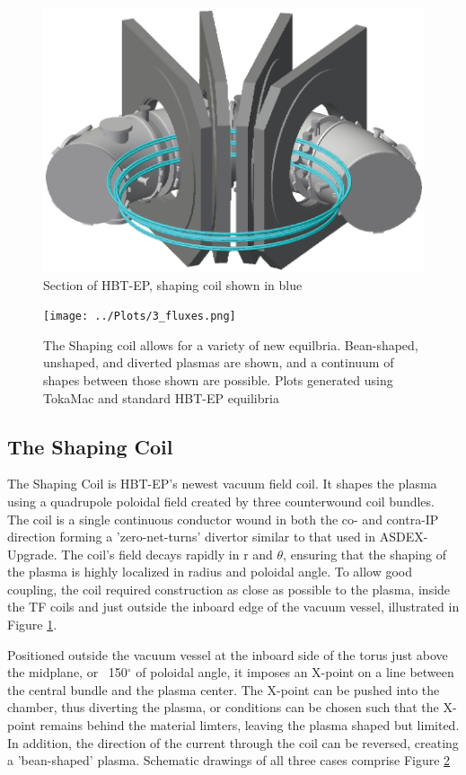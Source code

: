 \documentclass[aps,preprint,showpacs,superscriptaddress,groupedaddress]{revtex4}  %
\begin{document}
\begin{figure}[htb]
	\centering
\includegraphics[scale=.35]{../Plots/HBT_section_cropped.png}\caption{Section of HBT-EP, shaping coil shown in blue}
	\label{Coil_HBT_Section}
	\end{figure}
	
\begin{figure}[htb]
	\centering
\texttt{[image: ../Plots/3\_fluxes.png]}
	\caption{The Shaping coil allows for a variety of new equilbria.  Bean-shaped, unshaped, and diverted plasmas are shown, and a continuum of shapes between those shown are possible.  Plots generated using TokaMac and standard HBT-EP equilibria}
	\label{3_shapes}
	\end{figure}	

\subsection{The Shaping Coil}
    The Shaping Coil is HBT-EP's newest vacuum field coil.  It shapes the plasma using a quadrupole poloidal field created by three counterwound coil bundles.  The coil is a single continuous conductor wound in both the co- and contra-IP direction forming a 'zero-net-turns' divertor similar to that used in ASDEX-Upgrade\cite{Keilhacker}.  The coil's field decays rapidly in r and $\theta$, ensuring that the shaping of the plasma is highly localized in radius and poloidal angle.  To allow good coupling, the coil required construction as close as possible to the plasma, inside the TF coils and just outside the inboard edge of the vacuum vessel, illustrated in Figure \ref{Coil_HBT_Section}.\par
    Positioned outside the vacuum vessel at the inboard side of the torus just above the midplane, or ~150$^{\circ}$ of poloidal angle, it imposes an X-point on a line between the central bundle and the plasma center.  The X-point can be pushed into the chamber, thus diverting the plasma, or conditions can be chosen such that the X-point remains behind the material limters, leaving the plasma shaped but limited.  In addition, the direction of the current through the coil can be reversed, creating a 'bean-shaped' plasma.  Schematic drawings of all three cases comprise Figure \ref{3_shapes}\par
    
\end{document}
